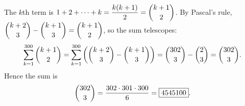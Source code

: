 The $k$th term is $1+2+\cdots+k=\dfrac{k(k+1)}2=\dbinom{k+1}{2}$. By Pascal's rule, $\dbinom{k+2}{3}-\dbinom{k+1}{3}=\dbinom{k+1}{2}$, so the sum telescopes:
\[\sum_{k=1}^{300}\dbinom{k+1}2=\sum_{k=1}^{300}\left(\dbinom{k+2}3-\dbinom{k+1}3\right)=\dbinom{302}{3}-\dbinom23=\dbinom{302}3.\]
Hence the sum is
\[\dbinom{302}{3}=\dfrac{302\cdot301\cdot300}{6}=\boxed{4545100}.\]
